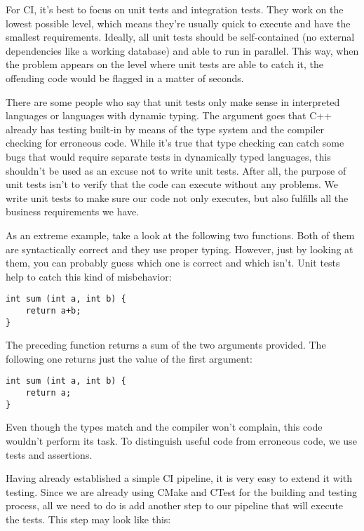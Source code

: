 For CI, it's best to focus on unit tests and integration tests. They work on the lowest possible level, which means they're usually quick to execute and have the smallest requirements. Ideally, all unit tests should be self-contained (no external dependencies like a working database) and able to run in parallel. This way, when the problem appears on the level where unit tests are able to catch it, the offending code would be flagged in a matter of seconds.

There are some people who say that unit tests only make sense in interpreted languages or languages with dynamic typing. The argument goes that C++ already has testing built-in by means of the type system and the compiler checking for erroneous code. While it's true that type checking can catch some bugs that would require separate tests in dynamically typed languages, this shouldn't be used as an excuse not to write unit tests. After all, the purpose of unit tests isn't to verify that the code can execute without any problems. We write unit tests to make sure our code not only executes, but also fulfills all the business requirements we have.

As an extreme example, take a look at the following two functions. Both of them are syntactically correct and they use proper typing. However, just by looking at them, you can probably guess which one is correct and which isn't. Unit tests help to catch this kind of misbehavior:

\begin{lstlisting}[style=styleCXX]
int sum (int a, int b) {
	return a+b;
}
\end{lstlisting}

The preceding function returns a sum of the two arguments provided. The following one returns just the value of the first argument:

\begin{lstlisting}[style=styleCXX]
int sum (int a, int b) {
	return a;
}
\end{lstlisting}

Even though the types match and the compiler won't complain, this code wouldn't perform its task. To distinguish useful code from erroneous code, we use tests and assertions.


Having already established a simple CI pipeline, it is very easy to extend it with testing. Since we are already using CMake and CTest for the building and testing process, all we need to do is add another step to our pipeline that will execute the tests. This step may look like this:

